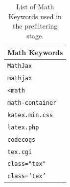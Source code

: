 \begin{table}[t!]
\caption{List of Math Keywords used in the prefiltering stage.}
\label{table:math-keywords}
\begin{center}
\begin{tabular}{l}
\multicolumn{1}{c}{\bf Math Keywords} \\
\midrule
\texttt{MathJax} \\
\texttt{mathjax} \\
\texttt{<math} \\
\texttt{math-container} \\
\texttt{katex.min.css} \\
\texttt{latex.php} \\
\texttt{codecogs} \\
\texttt{tex.cgi} \\
\texttt{class="tex"} \\
\texttt{class='tex'} \\
\end{tabular}
\end{center}
\end{table}